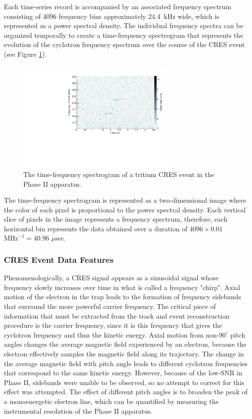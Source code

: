 Each time-series record is accompanied by an associated frequency spectrum consisting of 4096 frequency bins approximately 24.4~kHz wide, which is represented as a power spectral density. The individual frequency spectra can be organized temporally to create a time-frequency spectrogram that represents the evolution of the cyclotron frequency spectrum over the course of the CRES event (see Figure \ref{fig:chap3-tritium-event0-spectrogram}). 
\begin{figure}[htbp]
    \centering
    \includegraphics[width=0.7\textwidth]{figs/Chapter-3/T2_Event0.pdf}
    \caption{The time-frequency spectrogram of a tritium CRES event in the Phase II apparatus.}
    \label{fig:chap3-tritium-event0-spectrogram}
\end{figure}
The time-frequency spectrogram is represented as a two-dimensional image where the color of each pixel is proportional to the power spectral density. Each vertical slice of pixels in the image represents a frequency spectrum, therefore, each horizontal bin represents the data obtained over a duration of $4096\times 0.01$ $\mathrm{MHz}^{-1}=40.96$ $\mu$sec. 

\subsubsection*{CRES Event Data Features}

Phenomenologically, a CRES signal appears as a sinusoidal signal whose frequency slowly increases over time in what is called a frequency "chirp". Axial motion of the electron in the trap leads to the formation of frequency sidebands that surround the more powerful carrier frequency. The critical piece of information that must be extracted from the track and event reconstruction procedure is the carrier frequency, since it is this frequency that gives the cyclotron frequency and thus the kinetic energy. Axial motion from non-$90^\circ$ pitch angles changes the average magnetic field experienced by an electron, because the electron effectively samples the magnetic field along its trajectory. The change in the average magnetic field with pitch angle leads to different cyclotron frequencies that correspond to the same kinetic energy. However, because of the low-SNR in Phase II, sidebands were unable to be observed, so no attempt to correct for this effect was attempted. The effect of different pitch angles is to broaden the peak of a monoenergetic electron line, which can be quantified by measuring the instrumental resolution of the Phase II apparatus.


